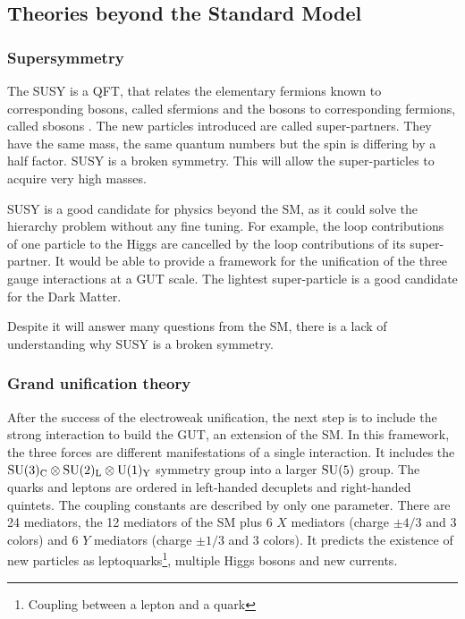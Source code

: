     \subsection{Theories beyond the Standard Model}

      \subsubsection{Supersymmetry}
    
      The \gls{SUSY} is a \gls{QFT}, that relates the elementary fermions known to corresponding bosons, called sfermions and the bosons to corresponding fermions, called sbosons \cite{Signer2009}.
      The new particles introduced are called super-partners.
      They have the same mass, the same quantum numbers but the spin is differing by a half factor.
      \gls{SUSY} is a broken symmetry. 
      This will allow the super-particles to acquire very high masses.

      \gls{SUSY} is a good candidate for physics beyond the \gls{SM}, as it could solve the hierarchy problem without any fine tuning.
      For example, the loop contributions of one particle to the Higgs are cancelled by the loop contributions of its super-partner.
      It would be able to provide a framework for the unification of the three gauge interactions at a GUT scale.
      The lightest super-particle is a good candidate for the Dark Matter.

      Despite it will answer many questions from the \gls{SM}, there is a lack of understanding why \gls{SUSY} is a broken symmetry.
      
      \subsubsection{Grand unification theory}
      
      After the success of the electroweak unification, the next step is to include the strong interaction to build the \gls{GUT}, an extension of the \gls{SM}.
      In this framework, the three forces are different manifestations of a single interaction. 
      It includes the $\rm{SU}(3)_{\rm{C}} \otimes \rm{SU}(2)_{\rm{L}} \otimes \rm{U}(1)_{\rm{Y}}$ symmetry group into a larger $\rm{SU}(5)$ group. 
      The quarks and leptons are ordered in left-handed decuplets and right-handed quintets.
      The coupling constants are described by only one parameter.  
      There are 24 mediators, the 12 mediators of the \gls{SM} plus 6 $X$ mediators (charge $\pm4/3$ and 3 colors) and 6 $Y$ mediators (charge $\pm1/3$ and 3 colors).
      It predicts the existence of new particles as leptoquarks\footnote{Coupling between a lepton and a quark}, multiple Higgs bosons and new currents.

